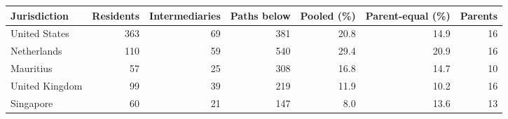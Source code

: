 \begin{tabular}{lrrrrrr}
\toprule
Jurisdiction & Residents & Intermediaries & Paths below & Pooled (\%) & Parent-equal (\%) & Parents \\
\midrule
United States & 363 & 69 & 381 & 20.8 & 14.9 & 16 \\
Netherlands & 110 & 59 & 540 & 29.4 & 20.9 & 16 \\
Mauritius & 57 & 25 & 308 & 16.8 & 14.7 & 10 \\
United Kingdom & 99 & 39 & 219 & 11.9 & 10.2 & 16 \\
Singapore & 60 & 21 & 147 & 8.0 & 13.6 & 13 \\
\bottomrule
\end{tabular}

